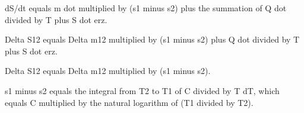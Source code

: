 dS/dt equals m dot multiplied by (s1 minus s2) plus the summation of Q dot divided by T plus S dot erz.  

Delta S12 equals Delta m12 multiplied by (s1 minus s2) plus Q dot divided by T plus S dot erz.  

Delta S12 equals Delta m12 multiplied by (s1 minus s2).  

s1 minus s2 equals the integral from T2 to T1 of C divided by T dT, which equals C multiplied by the natural logarithm of (T1 divided by T2).